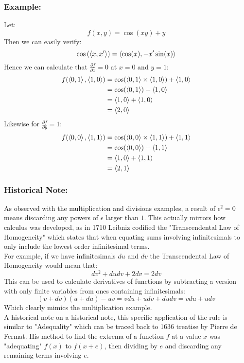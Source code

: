 \subsubsection{Example:}
Let:
\[f(x,y) = \cos(xy)+y\]
Then we can easily verify:
\[\cos\left(\left\langle x,x' \right\rangle\right) = \left\langle \cos(x),-x'\sin(x) \right\rangle\]
Hence we can calculate that $\frac{\partial f}{\partial x}=0$ at $x=0$ and $y=1$:
\[\begin{aligned}
	f(\left\langle 0,1 \right\rangle,\left\langle 1,0 \right\rangle) &= \cos(\left\langle 0,1 \right\rangle\times\left\langle 1,0 \right\rangle)+\left\langle 1,0 \right\rangle \\
	&= \cos(\left\langle 0,1 \right\rangle)+\left\langle 1,0 \right\rangle \\
	&= \left\langle 1,0 \right\rangle+\left\langle 1,0 \right\rangle \\
	&= \left\langle 2,0 \right\rangle \\
\end{aligned}\]
Likewise for $\frac{\partial f}{\partial y}=1$:
\[\begin{aligned}
	f(\left\langle 0,0 \right\rangle,\left\langle 1,1 \right\rangle) &= \cos(\left\langle 0,0 \right\rangle\times\left\langle 1,1 \right\rangle)+\left\langle 1,1 \right\rangle \\
	&= \cos(\left\langle 0,0 \right\rangle)+\left\langle 1,1 \right\rangle \\
	&= \left\langle 1,0 \right\rangle+\left\langle 1,1 \right\rangle \\
	&= \left\langle 2,1 \right\rangle \\
\end{aligned}\]

\subsubsection{Historical Note:}
As observed with the multiplication and divisions examples,
a result of $\epsilon^2 = 0$ means discarding any powers of $\epsilon$ larger than $1$.
This actually mirrors how calculus was developed,
as in 1710 Leibniz codified the "Transcendental Law of Homogeneity" which states that when equating sums involving infinitesimals to only include the lowest order infinitesimal terms.
\\

For example,
if we have infinitesimals $du$ and $dv$ the Transcendental Law of Homogeneity would mean that:
\[dv^2+dudv+2dv = 2dv\]
This can be used to calculate derivatives of functions by subtracting a version with only finite variables from ones containing infinitesimals: 
\[(v+dv)(u+du)-uv = vdu+udv+dudv= vdu+udv\]
Which clearly mimics the multiplication example.
\\

A historical note on a historical note,
this specific application of the rule is similar to "Adequality" which can be traced back to 1636 treatise by Pierre de Fermat.
His method to find the extrema of a function $f$ at a value $x$ was "adequating" $f(x)$ to $f(x+e)$, 
then dividing by $e$ and discarding any remaining terms involving $e$.
\\

